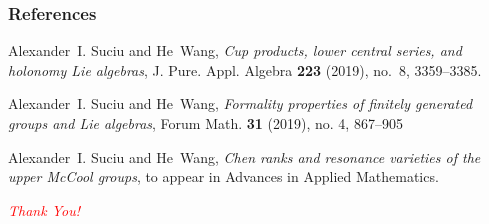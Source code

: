 \documentclass[dvipsnames]{beamer}
\theoremstyle{example}
\begin{document}
\begin{frame}
\frametitle{References}
\footnotesize{
\begin{thebibliography}{99}  

 	
Alexander~I. Suciu and He~Wang,  
{\em Cup products, lower central series, and holonomy Lie algebras}, 
J. Pure. Appl. Algebra \textbf{223} (2019), no.~8, 3359--3385.

Alexander~I. Suciu and He~Wang, 
\emph{Formality properties of finitely generated 
groups and Lie algebras}, Forum Math. \textbf{31} (2019), no. 4, 867--905

Alexander~I. Suciu and He~Wang, \emph{Chen ranks and resonance varieties 
of the upper McCool groups}, to appear in  Advances in Applied Mathematics. 
 
 
 

 
 
 
\end{thebibliography}
}
\vspace{0.5cm}
 
\Huge{\centerline{\it \textcolor{red}{Thank You!}}}
\end{frame}

 
  
 
\end{document}

